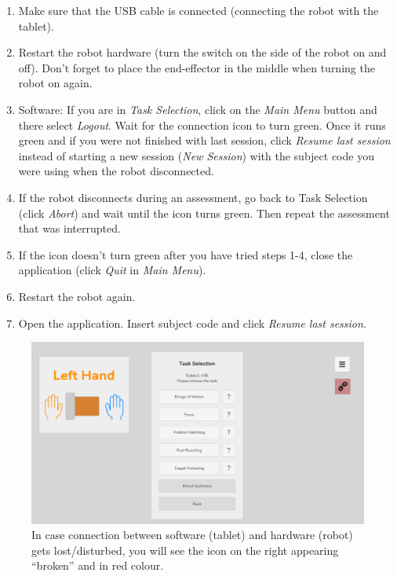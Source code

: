 \documentclass[10pt,oneside,a4paper]{article}
\begin{document}
\begin{enumerate}
\item Make sure that the USB cable is connected (connecting the robot with the tablet). 
\item Restart the robot hardware (turn the switch on the side of the robot on and off). Don’t forget to place the end-effector in the middle when turning the robot on again. 
\item Software: If you are in \emph{Task Selection}, click on the \emph{Main Menu} button and there select \emph{Logout}. Wait for the connection icon to turn green. Once it runs green and if you were not finished with last session, click \emph{Resume last session} instead of starting a new session (\emph{New Session}) with the subject code you were using when the robot disconnected. 
\item If the robot disconnects during an assessment, go back to Task Selection (click \emph{Abort}) and wait until the icon turns green. Then repeat the assessment that was interrupted. 
\item If the icon doesn’t turn green after you have tried steps 1-4, close the application (click \emph{Quit} in \emph{Main Menu}). 
\item Restart the robot again. 
\item Open the application.  Insert subject code and click \emph{Resume last session}.
\end{enumerate}

\begin{figure}[h!]
\begin{center}
\includegraphics[width=\columnwidth]{images/Troubleshooting/SoftwareDisconnects.png}
\caption{In case connection between software (tablet) and hardware (robot) gets lost/disturbed, you will see the icon on the right appearing “broken” and in red colour.}
\label{fig:Disconnection}
\end{center}
\end{figure}
\end{document}
